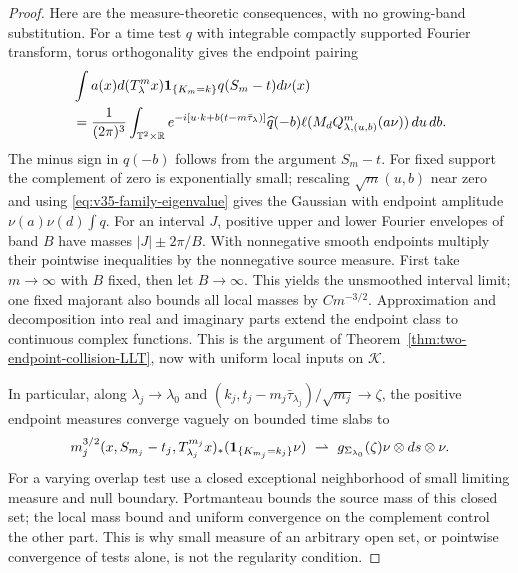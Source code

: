 \begin{proof}
Here are the measure-theoretic consequences, with no growing-band
substitution. For a time test $q$ with integrable compactly supported
Fourier transform, torus orthogonality gives the endpoint pairing
\begin{align*}
 &\int a(x)d(T_\lambda^m x)\mathbf1_{\{K_m=k\}}q(S_m-t)d\nu(x)\\
 &=\frac1{(2\pi)^3}\int_{\mathbb T^2\times\mathbb R}
   e^{-i[u\cdot k+b(t-m\bar\tau_\lambda)]}\widehat q(-b)
                 \ell(M_dQ_{\lambda,(u,b)}^m(a\nu))\,du\,db.
\end{align*}
The minus sign in $\widehat q(-b)$ follows from the argument $S_m-t$.
For fixed support the complement of zero is exponentially small;
rescaling $\sqrt m(u,b)$ near zero and using
\eqref{eq:v35-family-eigenvalue} gives the Gaussian with endpoint
amplitude $\nu(a)\nu(d)\int q$.
For an interval $J$, positive upper and lower Fourier envelopes of
band $B$ have masses $|J|\pm2\pi/B$. With nonnegative smooth endpoints
multiply their pointwise inequalities by the nonnegative source
measure. First take $m\to\infty$ with $B$ fixed, then let $B\to\infty$.
This yields the unsmoothed interval limit; one fixed majorant also
bounds all local masses by $Cm^{-3/2}$. Approximation and decomposition
into real and imaginary parts extend the endpoint class to continuous
complex functions. This is the argument of
Theorem~\ref{thm:two-endpoint-collision-LLT}, now with uniform local
inputs on $\mathcal K$.

In particular, along $\lambda_j\to\lambda_0$ and
$(k_j,t_j-m_j\bar\tau_{\lambda_j})/\sqrt{m_j}\to\zeta$, the positive
endpoint measures converge vaguely on bounded time slabs to
\begin{equation}\label{eq:v35-family-endpoint-measure}
 m_j^{3/2}(x,S_{m_j}-t_j,T_{\lambda_j}^{m_j}x)_*
                (\mathbf1_{\{K_{m_j}=k_j\}}\nu)
          \ \rightharpoonup\ g_{\Sigma_{\lambda_0}}(\zeta)\nu\otimes ds\otimes\nu.
\end{equation}
For a varying overlap test use a closed exceptional neighborhood of
small limiting measure and null boundary. Portmanteau bounds the
source mass of this closed set; the local mass bound and uniform
convergence on the complement control the other part. This is why
small measure of an arbitrary open set, or pointwise convergence of
tests alone, is not the regularity condition.


\end{proof}
